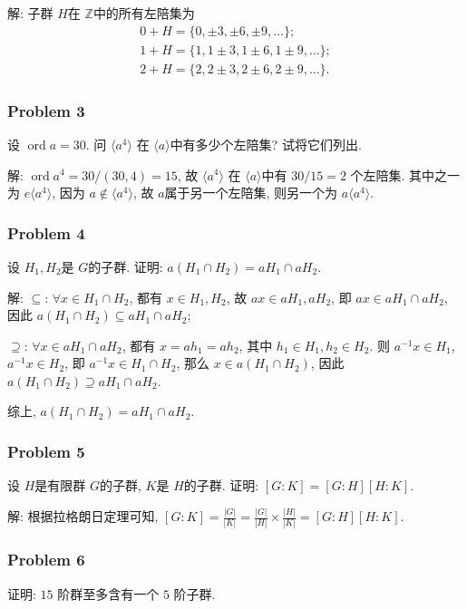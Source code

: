 \documentclass[a4paper,12pt]{ctexart}
\newcommand{\Z}{\mathbb{Z}}
\begin{document}
  解: 子群 $ H $在 $ \Z $中的所有左陪集为
  \begin{align*}
    0+H=\{0,\pm 3,\pm 6,\pm 9,\dots\};\\
    1+H=\{1,1\pm 3,1\pm 6,1\pm 9,\dots\};\\
    2+H=\{2,2\pm 3,2\pm 6,2\pm 9,\dots\}.
  \end{align*}

\subsubsection*{Problem 3}
  设 $ \operatorname{ord} a = 30 $. 问 $ \langle a^4\rangle $ 在  $ \langle a\rangle $中有多少个左陪集? 试将它们列出.

  解: $ \operatorname{ord}a^4=30/(30,4)=15 $, 故 $ \langle a^4\rangle $ 在  $ \langle a\rangle $中有 $ 30/15=2 $ 个左陪集. 
  其中之一为 $ e\langle a^4\rangle $, 因为 $ a\notin \langle a^4\rangle $, 故 $ a $属于另一个左陪集, 则另一个为 $ a\langle a^4\rangle $.

\subsubsection*{Problem 4}
  设 $ H_1,H_2 $是 $ G $的子群. 证明: $ a\left(H_1\cap H_2\right)=aH_1\cap aH_2 $.

  解: $ \subseteq $: $ \forall x\in H_1\cap H_2 $, 都有 $ x\in H_1,H_2 $, 故 $ ax\in aH_1,aH_2 $, 即 $ ax\in aH_1\cap aH_2 $, 
  因此 $ a\left(H_1\cap H_2\right)\subseteq aH_1\cap aH_2 $;

  $ \supseteq $: $ \forall x\in aH_1\cap aH_2 $, 都有 $ x=ah_1=ah_2 $, 其中 $ h_1\in H_1,h_2\in H_2 $. 则 $ a^{-1}x\in H_1 $, 
  $ a^{-1}x\in H_2 $, 即 $ a^{-1}x\in H_1\cap H_2 $, 那么 $ x\in a\left( H_1\cap H_2\right) $, 因此 $ a\left(H_1\cap H_2\right) \supseteq aH_1\cap aH_2 $.

  综上, $ a\left(H_1\cap H_2\right)=aH_1\cap aH_2 $.

\subsubsection*{Problem 5}
  设 $ H $是有限群 $ G $的子群, $ K $是 $ H $的子群. 证明: $ \left[G:K\right]=\left[G:H\right]\left[H:K\right] $.

  解: 根据拉格朗日定理可知, $ \left[G:K\right]= \frac{|G|}{|K|}=\frac{|G|}{|H|}\times\frac{|H|}{|K|}=\left[G:H\right]\left[H:K\right] $.

\subsubsection*{Problem 6}
  证明: $ 15 $ 阶群至多含有一个 $ 5 $ 阶子群.
\end{document}
